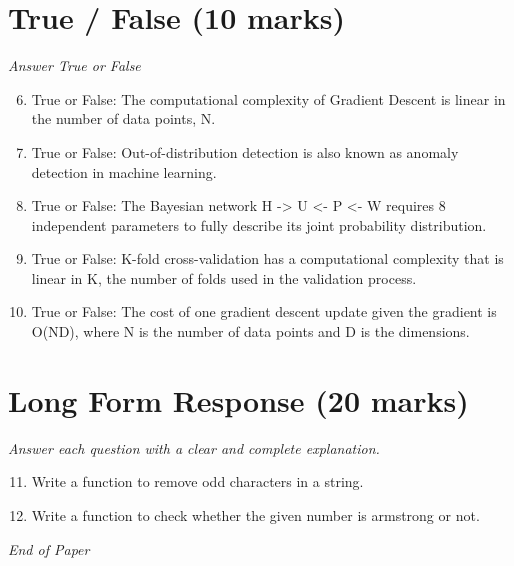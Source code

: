 \documentclass[12pt]{article}
\begin{document}
\section*{True / False (10 marks)}
\textit{Answer True or False}
\begin{enumerate}[label=\arabic*.]
\setcounter{enumi}{5}
\item True or False: The computational complexity of Gradient Descent is linear in the number of data points, N.
\item True or False: Out-of-distribution detection is also known as anomaly detection in machine learning.
\item True or False: The Bayesian network H -\textgreater{} U \textless{}- P \textless{}- W requires 8 independent parameters to fully describe its joint probability distribution.
\item True or False: K-fold cross-validation has a computational complexity that is linear in K, the number of folds used in the validation process.
\item True or False: The cost of one gradient descent update given the gradient is O(ND), where N is the number of data points and D is the dimensions.
\end{enumerate}

\section*{Long Form Response (20 marks)}
\textit{Answer each question with a clear and complete explanation.}
\begin{enumerate}[label=\arabic*.]
\setcounter{enumi}{10}
\item Write a function to remove odd characters in a string.
\item Write a function to check whether the given number is armstrong or not.
\end{enumerate}

\vfill
\noindent\textit{End of Paper}
\end{document}

